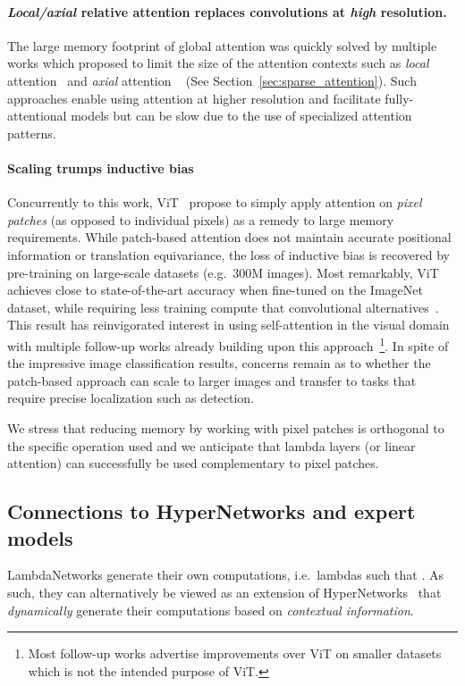 \documentclass{article} \usepackage{iclr2021_conference,times}
\begin{document}
\paragraph{\emph{Local/axial} relative attention replaces convolutions at \emph{high} resolution.}
The large memory footprint of global attention was quickly solved by multiple works which proposed to limit the size of the attention contexts such as \emph{local} attention~\citep{ramachandran2019sasa,hu2019local} and \emph{axial} attention ~\citep{ho2019axial,wang2020axialdeeplab,shen2020global} (See Section~\ref{sec:sparse_attention}).
Such approaches enable using attention at higher resolution and facilitate fully-attentional models but can be slow due to the use of specialized attention patterns.

\paragraph{Scaling trumps inductive bias}
Concurrently to this work, ViT~\citep{dosovitskiy2020image} propose to simply apply attention on \emph{pixel patches} (as opposed to individual pixels) as a remedy to large memory requirements.
While patch-based attention does not maintain accurate positional information or translation equivariance, the loss of inductive bias is recovered by pre-training on large-scale datasets (e.g.\ 300M images).
Most remarkably, ViT achieves close to state-of-the-art accuracy when fine-tuned on the ImageNet dataset, while requiring less training compute that convolutional alternatives~\citep{kolesnikov2020big,xie2020selftraining}.
This result has reinvigorated interest in using self-attention in the visual domain with multiple follow-up works already building upon this approach~\citep{touvron2021training}\footnote{Most follow-up works advertise improvements over ViT on smaller datasets which is not the intended purpose of ViT.}.
In spite of the impressive image classification results, concerns remain as to whether the patch-based approach can scale to larger images and transfer to tasks that require precise localization such as detection.

We stress that reducing memory by working with pixel patches is orthogonal to the specific operation used
and we anticipate that lambda layers (or linear attention) can successfully be used complementary to pixel patches.

\vspace{-0.1cm}
\subsection{Connections to HyperNetworks and expert models}
LambdaNetworks generate their own computations, i.e.\ lambdas such that .
As such, they can alternatively be viewed as an extension of HyperNetworks~\citep{ha2016hypernetworks} that \emph{dynamically} generate their computations based on \emph{contextual information}.
\end{document}
